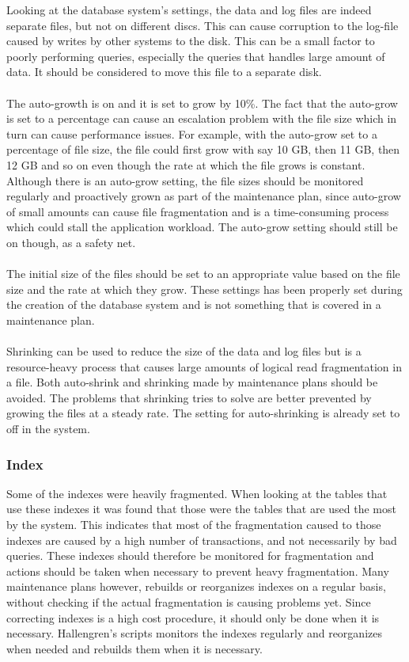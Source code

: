 \documentclass{cslthse-msc}
\begin{document}
\noindent Looking at the database system's settings, the data and log files are indeed separate files, but not on different discs. This can cause corruption to the log-file caused by writes by other systems to the disk. This can be a small factor to poorly performing queries, especially the queries that handles large amount of data. It should be considered to move this file to a separate disk. \\\\
The auto-growth is on and it is set to grow by 10\%. The fact that the auto-grow is set to a percentage can cause an escalation problem with the file size which in turn can cause performance issues. For example, with the auto-grow set to a percentage of file size, the file could first grow with say 10 GB, then 11 GB, then 12 GB and so on even though the rate at which the file grows is constant. Although there is an auto-grow setting, the file sizes should be monitored regularly and proactively grown as part of the maintenance plan, since auto-grow of small amounts can cause file fragmentation and is a time-consuming process which could stall the application workload. The auto-grow setting should still be on though, as a safety net. \\\\
The initial size of the files should be set to an appropriate value based on the file size and the rate at which they grow. These settings has been properly set during the creation of the database system and is not something that is covered in a maintenance plan.\\\\
Shrinking can be used to reduce the size of the data and log files but is a resource-heavy process that causes large amounts of logical read fragmentation in a file. Both auto-shrink and shrinking made by maintenance plans should be avoided. The problems that shrinking tries to solve are better prevented by growing the files at a steady rate. The setting for auto-shrinking is already set to off in the system.

\subsubsection{Index}
Some of the indexes were heavily fragmented. When looking at the tables that use these indexes it was found that those were the tables that are used the most by the system. This indicates that most of the fragmentation caused to those indexes are caused by a high number of transactions, and not necessarily by bad queries. These indexes should therefore be monitored for fragmentation and actions should be taken when necessary to prevent heavy fragmentation. Many maintenance plans however, rebuilds or reorganizes indexes on a regular basis, without checking if the actual fragmentation is causing problems yet. Since correcting indexes is a high cost procedure, it should only be done when it is necessary. Hallengren's \cite{Hallengren15} scripts monitors the indexes regularly and reorganizes when needed and rebuilds them when it is necessary.
\end{document}
